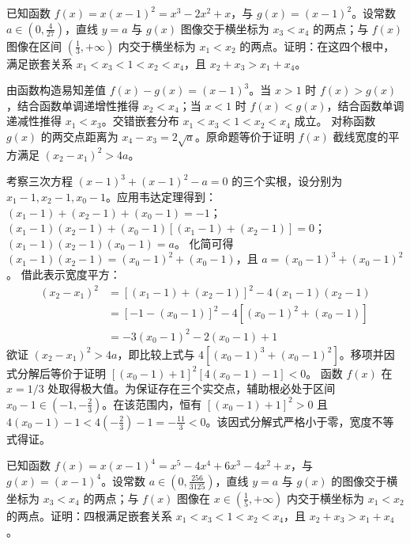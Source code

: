 \begin{example}
已知函数 $f(x) = x(x-1)^2 = x^3 - 2x^2 + x$，与 $g(x) = (x-1)^2$。设常数 $a \in \left(0, \frac{4}{27}\right)$，直线 $y=a$ 与 $g(x)$ 图像交于横坐标为 $x_3 < x_4$ 的两点；与 $f(x)$ 图像在区间 $\left(\frac{1}{3}, +\infty\right)$ 内交于横坐标为 $x_1 < x_2$ 的两点。证明：在这四个根中，满足嵌套关系 $x_1 < x_3 < 1 < x_2 < x_4$，且 $x_2 + x_3 > x_1 + x_4$。
\end{example}

\begin{solution}
由函数构造易知差值 $f(x) - g(x) = (x-1)^3$。当 $x > 1$ 时 $f(x) > g(x)$，结合函数单调递增性推得 $x_2 < x_4$；当 $x < 1$ 时 $f(x) < g(x)$，结合函数单调递减性推得 $x_1 < x_3$。交错嵌套分布 $x_1 < x_3 < 1 < x_2 < x_4$ 成立。
对称函数 $g(x)$ 的两交点距离为 $x_4 - x_3 = 2\sqrt{a}$。原命题等价于证明 $f(x)$ 截线宽度的平方满足 $(x_2 - x_1)^2 > 4a$。

考察三次方程 $(x-1)^3 + (x-1)^2 - a = 0$ 的三个实根，设分别为 $x_1-1, x_2-1, x_0-1$。应用韦达定理得到：
$(x_1-1) + (x_2-1) + (x_0-1) = -1$；
$(x_1-1)(x_2-1) + (x_0-1)[(x_1-1) + (x_2-1)] = 0$；
$(x_1-1)(x_2-1)(x_0-1) = a$。
化简可得 $(x_1-1)(x_2-1) = (x_0-1)^2 + (x_0-1)$，且 $a = (x_0-1)^3 + (x_0-1)^2$。
借此表示宽度平方：
\begin{align*}
(x_2 - x_1)^2 &= [(x_1-1) + (x_2-1)]^2 - 4(x_1-1)(x_2-1) \\
&= [-1-(x_0-1)]^2 - 4[(x_0-1)^2+(x_0-1)] \\
&= -3(x_0-1)^2 - 2(x_0-1) + 1
\end{align*}
欲证 $(x_2 - x_1)^2 > 4a$，即比较上式与 $4[(x_0-1)^3 + (x_0-1)^2]$。移项并因式分解后等价于证明 $[(x_0-1) + 1]^2 [4(x_0-1) - 1] < 0$。
函数 $f(x)$ 在 $x = 1/3$ 处取得极大值。为保证存在三个实交点，辅助根必处于区间 $x_0-1 \in \left(-1, -\frac{2}{3}\right)$。在该范围内，恒有 $[(x_0-1) + 1]^2 > 0$ 且 $4(x_0-1) - 1 < 4\left(-\frac{2}{3}\right) - 1 = -\frac{11}{3} < 0$。该因式分解式严格小于零，宽度不等式得证。
\end{solution}

\begin{example}
已知函数 $f(x) = x(x-1)^4 = x^5 - 4x^4 + 6x^3 - 4x^2 + x$，与 $g(x) = (x-1)^4$。设常数 $a \in \left(0, \frac{256}{3125}\right)$，直线 $y=a$ 与 $g(x)$ 的图像交于横坐标为 $x_3 < x_4$ 的两点；与 $f(x)$ 图像在 $x \in \left(\frac{1}{5}, +\infty\right)$ 内交于横坐标为 $x_1 < x_2$ 的两点。证明：四根满足嵌套关系 $x_1 < x_3 < 1 < x_2 < x_4$，且 $x_2 + x_3 > x_1 + x_4$。
\end{example}

